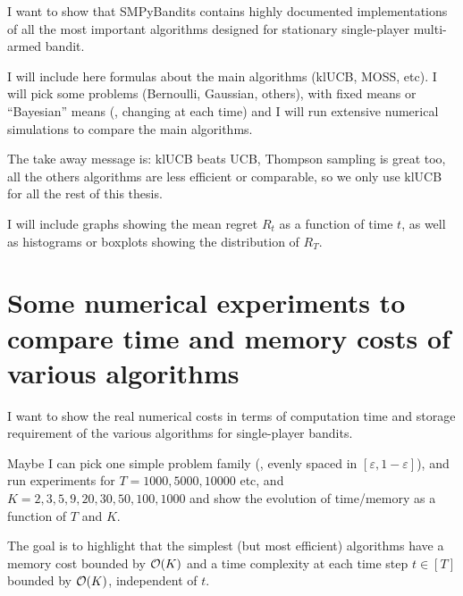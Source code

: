 I want to show that SMPyBandits contains highly documented implementations of all the most important algorithms designed for stationary single-player multi-armed bandit.

I will include here formulas about the main algorithms (klUCB, MOSS, etc).
I will pick some problems (Bernoulli, Gaussian, others), with fixed means or ``Bayesian'' means (\ie, changing at each time) and I will run extensive numerical simulations to compare the main algorithms.

The take away message is: klUCB beats UCB, Thompson sampling is great too, all the others algorithms are less efficient or comparable, so we only use klUCB for all the rest of this thesis.

I will include graphs showing the mean regret $R_t$ as a function of time $t$, as well as histograms or boxplots showing the distribution of $R_T$.


\section{Some numerical experiments to compare time and memory costs of various algorithms}
\label{sec:3:timeAndMemoryCosts}

I want to show the real numerical costs in terms of computation time and storage requirement of the various algorithms for single-player bandits.

Maybe I can pick one simple problem family (\eg, evenly spaced in $[\varepsilon,1-\varepsilon]$), and run experiments for $T=1000,5000,10000$ etc, and $K=2,3,5,9,20,30,50,100,1000$ and show the evolution of time/memory as a function of $T$ and $K$.

The goal is to highlight that the simplest (but most efficient) algorithms have a memory cost bounded by $\mathop{}\mathopen{}\mathcal{O}\mathopen{}\left(K\right)$ and a time complexity at each time step $t\in[T]$ bounded by $\mathop{}\mathopen{}\mathcal{O}\mathopen{}\left(K\right)$, independent of $t$.





